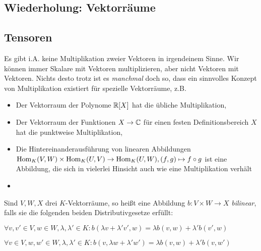 
\subsection{Wiederholung: Vektorräume}


\subsection{Tensoren}

\begin{remark}
Es gibt i.A. keine Multiplikation zweier Vektoren in irgendeinem Sinne. Wir können immer Skalare mit Vektoren multiplizieren, aber nicht Vektoren mit Vektoren. Nichts desto trotz ist es \emph{manchmal} doch so, dass ein sinnvolles Konzept von Multiplikation existiert für spezielle Vektorräume, z.B.
\begin{itemize}
	\item Der Vektorraum der Polynome $\mathbb{R}[X]$ hat die übliche Multiplikation,
	\item Der Vektorraum der Funktionen $X\to\mathbb{C}$ für einen festen Definitionsbereich $X$ hat die punktweise Multiplikation,
	\item Die Hintereinanderausführung von linearen Abbildungen $\operatorname{Hom}_K(V,W) \times \operatorname{Hom}_K(U,V) \to \operatorname{Hom}_K(U,W), (f,g) \mapsto f\circ g$ ist eine Abbildung, die sich in vielerlei Hinsicht auch wie eine Multiplikation verhält
	\item 
\end{itemize}

\end{remark}

\begin{definition}
Sind $V,W,X$ drei $K$-Vektorräume, so heißt eine Abbildung $b: V\times W\to X$ \emph{bilinear}, falls sie die folgenden beiden Distributivgesetze erfüllt:
\begin{description}
	\item $\forall v,v'\in V, w\in W, \lambda,\lambda'\in K: b(\lambda v+ \lambda' v', w) = \lambda b(v,w) + \lambda' b(v',w)$
	\item $\forall v\in V,  w,w'\in W, \lambda,\lambda'\in K: b(v,\lambda w+\lambda'w') = \lambda b(v,w) + \lambda' b(v,w')$
\end{description}
\end{definition}

